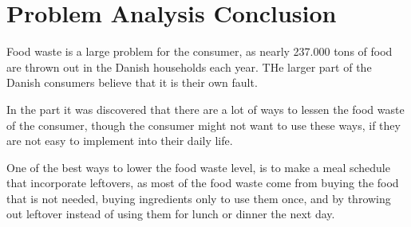 \chapter{Problem Analysis Conclusion}

Food waste is a large problem for the consumer, as nearly 237.000 tons of food are thrown out in the Danish households each year. THe larger part of the Danish consumers believe that it is their own fault.

In the part it was discovered that there are a lot of ways to lessen the food waste of the consumer, though the consumer might not want to use these ways, if they are not easy to implement into their daily life.

One of the best ways to lower the food waste level, is to make a meal schedule that incorporate leftovers, as most of the food waste come from buying the food that is not needed, buying ingredients only to use them once, and by throwing out leftover instead of using them for lunch or dinner the next day.

